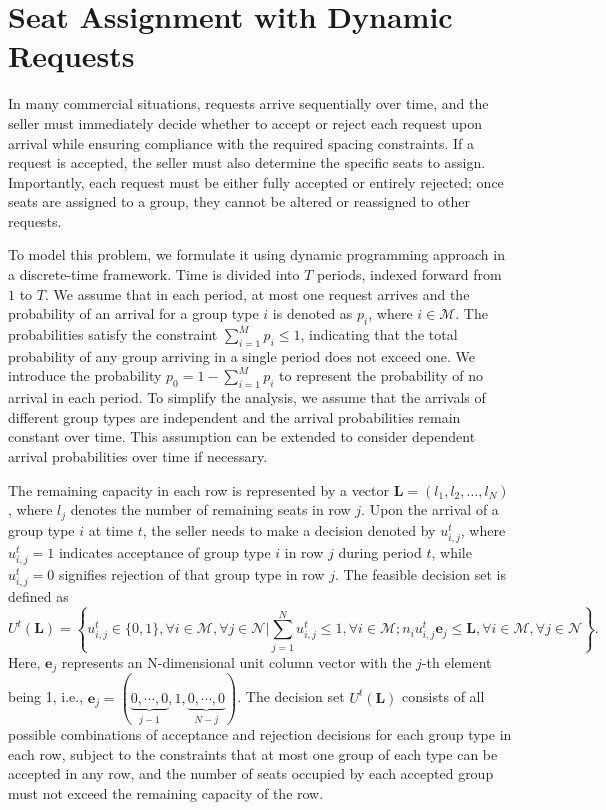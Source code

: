 \section{Seat Assignment with Dynamic Requests}\label{sec_dynamic_seat}

In many commercial situations, requests arrive sequentially over time, and the seller must immediately decide whether to accept or reject each request upon arrival while ensuring compliance with the required spacing constraints. If a request is accepted, the seller must also determine the specific seats to assign. Importantly, each request must be either fully accepted or entirely rejected; once seats are assigned to a group, they cannot be altered or reassigned to other requests.

To model this problem, we formulate it using dynamic programming approach in a discrete-time framework. Time is divided into $T$ periods, indexed forward from $1$ to $T$. We assume that in each period, at most one request arrives and the probability of an arrival for a group type $i$ is denoted as $p_i$, where $i \in \mathcal{M}$. The probabilities satisfy the constraint $\sum_{i=1}^M p_i \leq 1$, indicating that the total probability of any group arriving in a single period does not exceed one. We introduce the probability $p_0 = 1 - \sum_{i=1}^{M} p_i$ to represent the probability of no arrival in each period. To simplify the analysis, we assume that the arrivals of different group types are independent and the arrival probabilities remain constant over time. This assumption can be extended to consider dependent arrival probabilities over time if necessary.

The remaining capacity in each row is represented by a vector $\mathbf{L} = (l_1, l_2, \ldots, l_N)$, where $l_j$ denotes the number of remaining seats in row $j$. Upon the arrival of a group type $i$ at time $t$, the seller needs to make a decision denoted by $u_{i,j}^{t}$, where $u_{i,j}^{t} = 1$ indicates acceptance of group type $i$ in row $j$ during period $t$, while $u_{i,j}^{t} = 0$ signifies rejection of that group type in row $j$. The feasible decision set is defined as $$U^{t}(\mathbf{L}) = \left\{u_{i,j}^{t} \in \{0,1\}, \forall i \in \mathcal{M}, \forall j \in \mathcal{N} \bigg| \sum_{j=1}^{N} u_{i,j}^{t} \leq 1, \forall i \in \mathcal{M}; n_{i}u_{i,j}^{t}\mathbf{e}_j \leq \mathbf{L}, \forall i \in \mathcal{M}, \forall j \in \mathcal{N}\right\}.$$
Here, $\mathbf{e}_j$ represents an N-dimensional unit column vector with the $j$-th element being 1, i.e., $\mathbf{e}_j = (\underbrace{0, \cdots, 0}_{j-1}, 1, \underbrace{0, \cdots, 0}_{N-j})$. The decision set $U^{t}(\mathbf{L})$ consists of all possible combinations of acceptance and rejection decisions for each group type in each row, subject to the constraints that at most one group of each type can be accepted in any row, and the number of seats occupied by each accepted group must not exceed the remaining capacity of the row.

